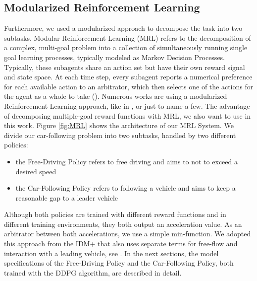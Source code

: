 \documentclass[review]{elsarticle}
\providecommand{\3}{{\ss}}
\begin{document}
	
	\subsection{\label{MRL}Modularized Reinforcement Learning}
	Furthermore, we used a modularized approach to decompose the task into two subtasks. Modular Reinforcement Learning (MRL) refers to the decomposition of a complex, multi-goal
	problem into a collection of simultaneously running single goal learning processes, typically modeled as Markov Decision Processes. Typically, these subagents share an action set but have their own reward signal and state space. At each
	time step, every subagent reports a numerical preference for
	each available action to an arbitrator, which then selects one
	of the actions for the agent as a whole to take (\cite{MRL}). Numerous works are using a modularized Reinforcement Learning approach, like in \cite{MRLexample1}, \cite{MRLexample2} or \cite{MRLexample3} just to name a few. The advantage of decomposing multiple-goal reward functions with MRL, we also want to use in this work. 
	Figure \ref{fig:MRL} shows the architecture of our MRL System. We divide our car-following problem into two subtasks, handled by two different policies: 
	\begin{itemize}
		\item the Free-Driving Policy refers to free driving and aims to not to exceed a desired speed
		\item the Car-Following Policy refers to following a vehicle and aims to keep a reasonable gap to a leader vehicle  	
	\end{itemize}
	Although both policies are trained with different reward functions and in different training environments, they both output an acceleration value. As an arbitrator between both accelerations, we use a simple min-function. We adopted this approach from the IDM+ that also uses separate terms for free-flow and interaction with a leading vehicle, see \cite{idm_plus}. In the next sections, the model specifications of the Free-Driving Policy and the Car-Following Policy, both trained with the DDPG algorithm, are described in detail.
	
\end{document}
